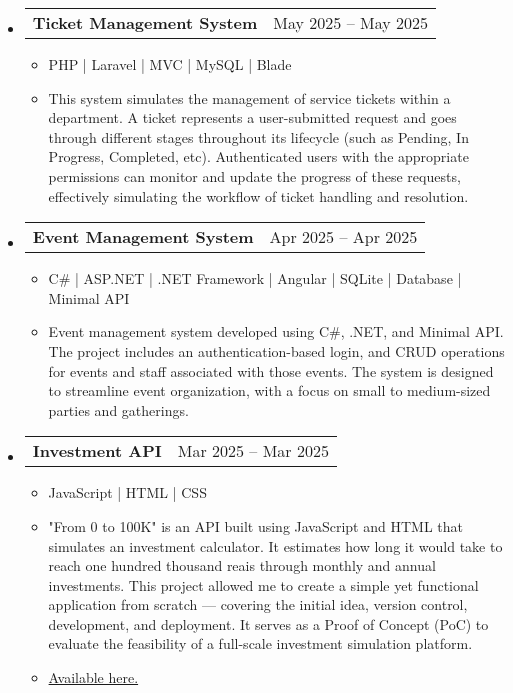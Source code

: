 \documentclass{article}
\newcommand{\icon}[1]{\begin{tabular}{p{\iconWidth}}{#1}\end{tabular}}
\newcommand{\cvEntryNTD}[3]{
    \begin{itemize}[leftmargin=\entryMargin]
        \item[]
            \begin{tabularx}{\textwidth-\entryMargin}{Xr}
                \textbf{\color{black}#1} & {\color{secondary}\small#2} \\
            \end{tabularx}\vspace{-0.75em}
        \begin{itemize}[labelsep=\entryMargin-1.5em,leftmargin=\entryMargin]
            \small#3
        \end{itemize}
    \end{itemize}
}
\newcommand{\cvItem}[1]{\item[\bulletIcon]{#1\vspace{-0.25em}}}
\newcommand{\cvItemS}[1]{\item[\accentIcon]{#1\vspace{-0.25em}}}
\def \entryMargin{1em}
\def \iconWidth{1.5em}
\def \bulletIcon{\icon{\faAngleRight}}
\def \accentIcon{\icon{\faAngleDoubleRight}} %
\begin{document}
\cvEntryNTD{Ticket Management System}{May 2025 – May 2025}{
	\cvItemS{ PHP | Laravel | MVC | MySQL | Blade }
	\cvItem{This system simulates the management of service tickets within a department. A ticket represents a user-submitted request and goes through different stages throughout its lifecycle (such as Pending, In Progress, Completed, etc). Authenticated users with the appropriate permissions can monitor and update the progress of these requests, effectively simulating the workflow of ticket handling and resolution.}
}



\cvEntryNTD{Event Management System}{Apr 2025 – Apr 2025}{
	\cvItemS{ C\# | ASP.NET | .NET Framework | Angular | SQLite | Database | Minimal API }
	\cvItem{Event management system developed using C\#, .NET, and Minimal API. The project includes an authentication-based login, and CRUD operations for events and staff associated with those events. The system is designed to streamline event organization, with a focus on small to medium-sized parties and gatherings.}
}

\cvEntryNTD{Investment API}{Mar 2025 – Mar 2025}{
	\cvItemS{ JavaScript | HTML | CSS }
	\cvItem{"From 0 to 100K" is an API built using JavaScript and HTML that simulates an investment calculator. It estimates how long it would take to reach one hundred thousand reais through monthly and annual investments. This project allowed me to create a simple yet functional application from scratch — covering the initial idea, version control, development, and deployment. It serves as a Proof of Concept (PoC) to evaluate the feasibility of a full-scale investment simulation platform.}
	\cvItem{\href{https://investimento-api.vercel.app/}{Available here.}}	
}

\end{document}
